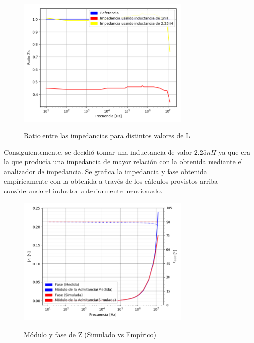 \begin{figure}[H]
\centering
\includegraphics[width=0.75\textwidth]{Ejercicio_1(Germo)/Grafico/capacitor_relacion_entre_Z.png}
\label{fig:capacitor_relacion_entre_Z}
\caption{Ratio entre las impedancias para distintos valores de L}
\end{figure}


Consiguientemente, se decidió tomar una inductancia de valor $2.25nH$ ya que era la que producía una impedancia de mayor relación con la obtenida mediante el analizador de impedancia. Se grafica la impedancia y fase obtenida empíricamente con la obtenida a través de los cálculos provistos arriba considerando el inductor anteriormente mencionado.

\begin{figure}[H]
\centering
\includegraphics[width=0.75\textwidth]{Ejercicio_1(Germo)/Grafico/Capacitor_relacion_entre_Z_y_fases.png}
\label{fig:Capacitor_relacion_entre_Z_y_fases}
\caption{Módulo y fase de Z (Simulado vs Empírico)}
\end{figure}

